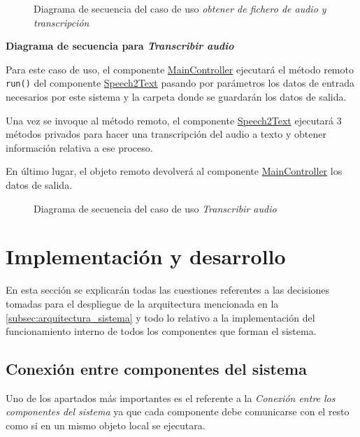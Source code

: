 \documentclass[../main.tex]{subfiles}
\begin{document}
\begin{figure}[H]
    \centering
    
    \caption{Diagrama de secuencia del caso de uso \textit{obtener de fichero de audio y transcripción}}
    \label{fig:flow_audioprocess}
\end{figure}

\textbf{Diagrama de secuencia para \textit{Transcribir audio}}

Para este caso de uso, el componente \hyperref[par:maincontroller]{MainController} ejecutará el método remoto \verb+run()+ del componente  \hyperref[par:speech2text]{Speech2Text} pasando por parámetros los datos de entrada necesarios por este sistema y la carpeta donde se guardarán los datos de salida.

Una vez se invoque al método remoto, el componente \hyperref[par:speech2text]{Speech2Text} ejecutará 3 métodos privados para hacer una transcripción del audio a texto y obtener información relativa a ese proceso.

En último lugar, el objeto remoto devolverá al componente \hyperref[par:maincontroller]{MainController} los datos de salida.

\begin{figure}[H]
    \centering
    
    \caption{Diagrama de secuencia del caso de uso \textit{Transcribir audio}}
    \label{fig:flow_spech2text}
\end{figure}


\section{Implementación y desarrollo}\label{sec:implementacion}

En esta sección se explicarán todas las cuestiones referentes a las decisiones tomadas para el despliegue de la arquitectura mencionada en la \autoref{subsec:arquitectura_sistema} y todo lo relativo a la implementación del funcionamiento interno de todos los componentes que forman el sistema.

\subsection{Conexión entre componentes del sistema}\label{subsec:impl_conexion}
Uno de los apartados más importantes es el referente a la \textit{Conexión entre los componentes del sistema} ya que cada componente debe comunicarse con el resto como si en un mismo objeto local se ejecutara.
\end{document}

